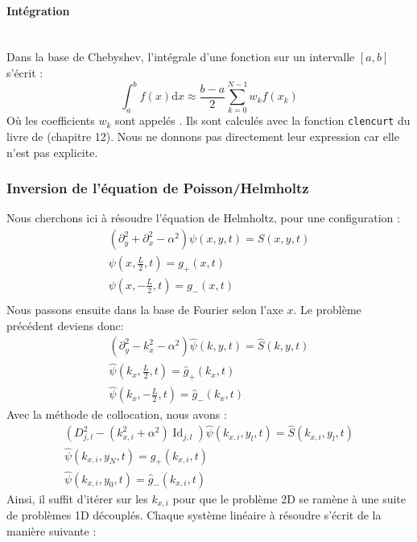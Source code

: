 \paragraph{Intégration}~\\
Dans la base de Chebyshev, l'intégrale d'une fonction sur un intervalle $[a, b]$ s'écrit : 
\begin{equation}
	\int_a^b f(x) \mathrm{d}x \approx \frac{b-a}{2}\sum_{k=0}^{N-1} w_k f(x_k)
\end{equation}
Où les coefficients $w_k$ sont appelés . Ils sont calculés avec la fonction \verb|clencurt| du livre de \cite{Trefethen2000} (chapitre 12). Nous ne donnons pas directement leur expression car elle n'est pas explicite.
\subsubsection{Inversion de l'équation de Poisson/Helmholtz}
Nous cherchons ici à résoudre l'équation de Helmholtz, pour une configuration  : 
\begin{align}
	\left(\partial_y^2+\partial_x^2-\alpha^2\right)\psi(x, y, t) = S(x, y, t)\\
\psi(x,\frac{L}{2}, t) = g_+(x, t)\\
\psi(x,-\frac{L}{2}, t) = g_-(x, t)\\
\end{align} 
Nous passons ensuite dans la base de Fourier selon l'axe $x$. Le problème précédent deviens donc: 
\begin{align}
	\left(\partial_y^2 - k_x^2-\alpha^2 \right)\widehat{\psi}(k, y, t)=\widehat{S}(k, y, t)\\
	\widehat{\psi}(k_x,\frac{L}{2}, t) = \widehat{g}_+(k_x, t)\\
	\widehat{\psi}(k_x,-\frac{L}{2}, t) = \widehat{g}_-(k_x, t)
\end{align}
Avec la méthode de collocation, nous avons : 
\begin{align}
	\left(D^2_{j,l} -(k_{x,i}^2 +\alpha^2)\operatorname{Id}_{j,l}\right)\widehat{\psi}(k_{x,i}, y_l, t) =\widehat{S}(k_{x,i}, y_l, t)\\
	\widehat{\psi}(k_{x,i},y_N, t) = \widehat{g}_+(k_{x,i}, t)\\
	\widehat{\psi}(k_{x,i},y_0, t) = \widehat{g}_-(k_{x,i}, t)
\end{align}
Ainsi, il suffit d'itérer sur les $k_{x,i}$ pour que le problème 2D se ramène à une suite de problèmes 1D découplés.
Chaque système linéaire à résoudre s'écrit de la manière suivante : 
